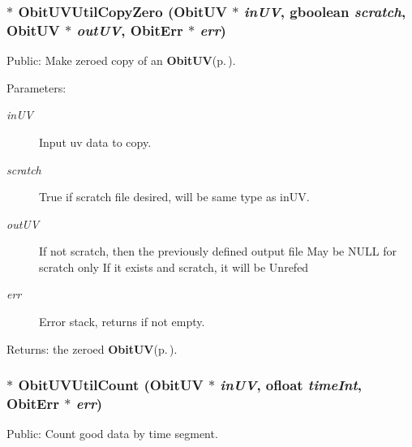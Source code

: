 \subsubsection{$\ast$ Obit\-UVUtil\-Copy\-Zero ({\bf Obit\-UV} $\ast$ {\em in\-UV}, gboolean {\em scratch}, {\bf Obit\-UV} $\ast$ {\em out\-UV}, {\bf Obit\-Err} $\ast$ {\em err})}\label{ObitUVUtil_8c_a5}


Public: Make zeroed copy of an {\bf Obit\-UV}{\rm (p.\,\pageref{structObitUV})}. 

\begin{Desc}
\item[Parameters:]
\begin{description}
\item[{\em in\-UV}]Input uv data to copy. \item[{\em scratch}]True if scratch file desired, will be same type as in\-UV. \item[{\em out\-UV}]If not scratch, then the previously defined output file May be NULL for scratch only If it exists and scratch, it will be Unrefed \item[{\em err}]Error stack, returns if not empty. \end{description}
\end{Desc}
\begin{Desc}
\item[Returns:]the zeroed {\bf Obit\-UV}{\rm (p.\,\pageref{structObitUV})}. \end{Desc}
\subsubsection{$\ast$ Obit\-UVUtil\-Count ({\bf Obit\-UV} $\ast$ {\em in\-UV}, {\bf ofloat} {\em time\-Int}, {\bf Obit\-Err} $\ast$ {\em err})}\label{ObitUVUtil_8c_a14}


Public: Count good data by time segment. 

